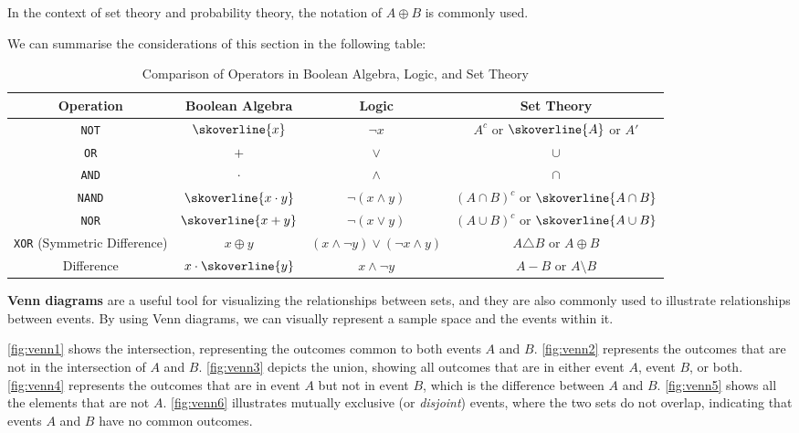\begin{remark}
    In the context of set theory and probability theory, the notation of \(A \oplus B\) is commonly used. 
\end{remark}

We can summarise the considerations of this section in the following table:

\newpage

\begin{table}[htbp]
    \centering
    \renewcommand{\arraystretch}{1.5} %
    \begin{tabular}{|c|c|c|c|}
    \hline
    \textbf{Operation} & \textbf{Boolean Algebra} & \textbf{Logic} & \textbf{Set Theory} \\
    \hline
    \texttt{NOT} & $\skoverline{x}$ & $\neg x$ & $A^c$ or $\skoverline{A}$ or $A'$\\
    \hline
    \texttt{OR} & $+$ & $\vee$ & $\cup$ \\
    \hline
    \texttt{AND} & $\cdot$ & $\wedge$ & $\cap$ \\
    \hline
    \texttt{NAND} & $\skoverline{x \cdot y}$ & $\neg (x \wedge y)$ & $(A \cap B)^c$ or \(\skoverline{A \cap B}\)\\
    \hline
    \texttt{NOR} & $\skoverline{x + y}$ & $\neg (x \vee y)$ & $(A \cup B)^c$ or \(\skoverline{A \cup B}\) \\
    \hline
    \texttt{XOR} (Symmetric Difference) & $x \oplus y$ & $(x \wedge \neg y) \vee (\neg x \wedge y)$ & $A \triangle B$ or \(A \oplus B\) \\
    \hline
    Difference & $x \cdot \skoverline{y}$ & $x \wedge \neg y$ & $A - B$ or \( A \setminus B \) \\
    \hline
    \end{tabular}
    \caption{Comparison of Operators in Boolean Algebra, Logic, and Set Theory}
    \end{table}
    
\textbf{Venn diagrams} are a useful tool for visualizing the relationships between sets, and they are also commonly used to illustrate relationships between events. By using Venn diagrams, we can visually represent a sample space and the events within it.

\autoref{fig:venn1} shows the intersection, representing the outcomes common to both events \( A \) and \( B \). \autoref{fig:venn2} represents the outcomes that are not in the intersection of \( A \) and \( B \). \autoref{fig:venn3} depicts the union, showing all outcomes that are in either event \( A \), event \( B \), or both. \autoref{fig:venn4} represents the outcomes that are in event \( A \) but not in event \( B \), which is the difference between \( A \) and \( B \). \autoref{fig:venn5} shows all the elements that are not \(A\). \autoref{fig:venn6} illustrates mutually exclusive (or \textit{disjoint}) events, where the two sets do not overlap, indicating that events \( A \) and \( B \) have no common outcomes.

